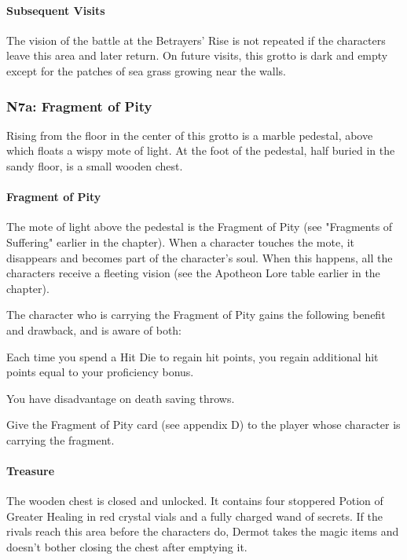 \documentclass[10pt,a4paper,twoside,twocolumn,openany,nodeprecatedcode]{dndbook}
\begin{document}
\paragraph{Subsequent Visits}
The vision of the battle at the Betrayers' Rise is not repeated if the characters leave this area and later return. On future visits, this grotto is dark and empty except for the patches of sea grass growing near the walls.

\subsubsection{N7a: Fragment of Pity}
\begin{DndReadAloud}{}
Rising from the floor in the center of this grotto is a marble pedestal, above which floats a wispy mote of light. At the foot of the pedestal, half buried in the sandy floor, is a small wooden chest.

\end{DndReadAloud}

\paragraph{Fragment of Pity}
The mote of light above the pedestal is the Fragment of Pity (see "Fragments of Suffering" earlier in the chapter). When a character touches the mote, it disappears and becomes part of the character's soul. When this happens, all the characters receive a fleeting vision (see the Apotheon Lore table earlier in the chapter).

The character who is carrying the Fragment of Pity gains the following benefit and drawback, and is aware of both:

\begin{DndComment}{}

\begin{description}[nolistsep]
\item[Benefit.]
Each time you spend a Hit Die to regain hit points, you regain additional hit points equal to your proficiency bonus.
\item[Drawback.]
You have disadvantage on death saving throws.
\end{description}

\end{DndComment}

Give the Fragment of Pity card (see appendix D) to the player whose character is carrying the fragment.

\paragraph{Treasure}
The wooden chest is closed and unlocked. It contains four stoppered Potion of Greater Healing in red crystal vials and a fully charged wand of secrets. If the rivals reach this area before the characters do, Dermot takes the magic items and doesn't bother closing the chest after emptying it.
\end{document}

